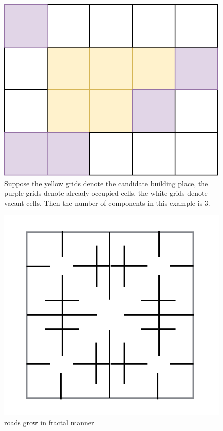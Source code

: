 \documentclass{beamer}
\begin{document}
\begin{frame}
  \begin{figure}
\center
\includegraphics[scale=0.5]{numComponents.pdf}
\caption{
Suppose the yellow grids denote the candidate building place,
the purple grids denote already occupied cells,
the white grids denote vacant cells.
Then the number of components in this example is 3.}
\label{fig: numComponents}
\end{figure}
\end{frame}

\begin{frame}
  \begin{figure}
\center
\includegraphics[scale=0.5]{prebuildRoad.png}
\caption{roads grow in fractal manner}
\label{fig: prebuildRoad}
\end{figure}
\end{frame}
\end{document}
